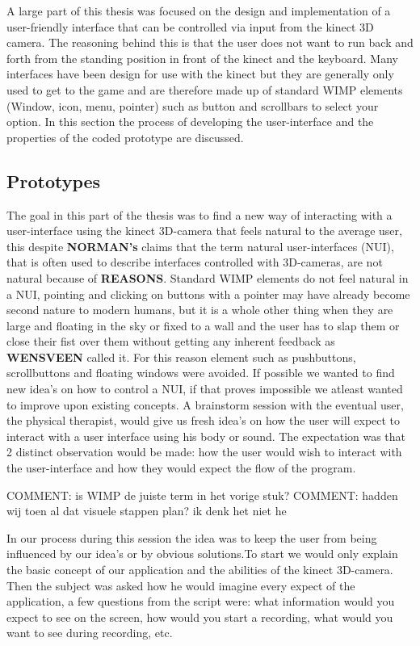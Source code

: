 A large part of this thesis was focused on the design and implementation of a user-friendly interface that can be controlled via input from the kinect 3D camera. The reasoning behind this is that the user does not want to run back and forth from the standing position in front of the kinect and the keyboard. Many interfaces have been design for use with the kinect but they are generally only used to get to the game and are therefore made up of standard WIMP elements (Window, icon, menu, pointer) such as button and scrollbars to select your option. In this section the process of developing the user-interface and the properties of the coded prototype are discussed.

\subsection{Prototypes}

The goal in this part of the thesis was to find a new way of interacting with a user-interface using the kinect 3D-camera that feels natural to the average user, this despite  \textbf{NORMAN's} claims that the  term natural user-interfaces (NUI), that is often used to describe interfaces controlled with 3D-cameras, are not natural because  of \textbf{REASONS}. Standard WIMP elements do not feel natural in a NUI, pointing and clicking on buttons with a pointer may have already become second nature to modern humans, but it is a whole other thing when they are large and floating in the sky or fixed to a wall and the user has to slap them or close their fist over them without getting any inherent feedback as \textbf{WENSVEEN} called it. For this reason element such as pushbuttons, scrollbuttons and floating windows were avoided. If possible we wanted to find new idea's on how to control a NUI, if that proves impossible we atleast wanted to improve upon existing concepts. A brainstorm session with the eventual user, the physical therapist, would give us fresh idea's on how the user will expect to interact with a user interface using his body or sound. The expectation was that 2 distinct observation would be made: how the user would wish to interact with the user-interface and how they would expect the flow of the program. 

 {\large COMMENT: is WIMP de juiste term in het vorige stuk? }
 {\large COMMENT: hadden wij toen al dat visuele stappen plan? ik denk het niet he }

In our process during this session the idea was to keep the user from being influenced by our idea's or by obvious solutions.To start we would only explain the basic concept of our application and the abilities of the kinect 3D-camera. Then the subject was asked how he would imagine every expect of the application, a few questions from the script were: what information would you expect to see on the screen, how would you start a recording, what would you want to see during recording, etc. 

